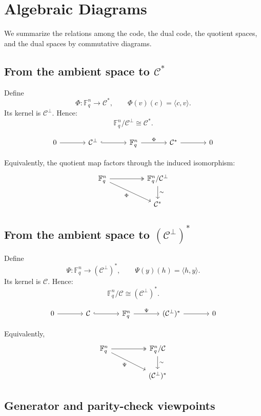 \documentclass[11pt]{article}
\theoremstyle{remark}
\newcommand{\F}{\mathbb{F}}
\newcommand{\C}{\mathcal{C}}
\begin{document}
	\newpage
	\section{Algebraic Diagrams}
	
	We summarize the relations among the code, the dual code, the quotient spaces, and the dual spaces by commutative diagrams.
	
	\subsection{From the ambient space to \(\C^*\)}
	
	Define
	\[
	\Phi:\F_q^n\to \C^*,\qquad \Phi(v)(c)=\langle c,v\rangle.
	\]
	Its kernel is \(\C^\perp\). Hence:
	\[
	\F_q^n/\C^\perp \cong \C^*.
	\]
	
	\[
	\begin{tikzcd}[column sep=large]
		0 \arrow[r] & \C^\perp \arrow[r, hook] & \F_q^n \arrow[r, "\Phi"] & \C^* \arrow[r] & 0
	\end{tikzcd}
	\]
	
	Equivalently, the quotient map factors through the induced isomorphism:
	\[
	\begin{tikzcd}[column sep=huge]
		\F_q^n \arrow[r, two heads] \arrow[dr, "\Phi"'] & \F_q^n/\C^\perp \arrow[d, "\sim"] \\
		& \C^*
	\end{tikzcd}
	\]
	\subsection{From the ambient space to \((\C^\perp)^*\)}
	
	Define
	\[
	\Psi:\F_q^n\to (\C^\perp)^*,\qquad \Psi(y)(h)=\langle h,y\rangle.
	\]
	Its kernel is \(\C\). Hence:
	\[
	\F_q^n/\C \cong (\C^\perp)^*.
	\]
	
	\[
	\begin{tikzcd}[column sep=large]
		0 \arrow[r] & \C \arrow[r, hook] & \F_q^n \arrow[r, "\Psi"] & (\C^\perp)^* \arrow[r] & 0
	\end{tikzcd}
	\]
	
	Equivalently,
	\[
	\begin{tikzcd}[column sep=huge]
		\F_q^n \arrow[r, two heads] \arrow[dr, "\Psi"'] & \F_q^n/\C \arrow[d, "\sim"] \\
		& (\C^\perp)^*
	\end{tikzcd}
	\]
	
	\subsection{Generator and parity-check viewpoints}
	
\end{document}
